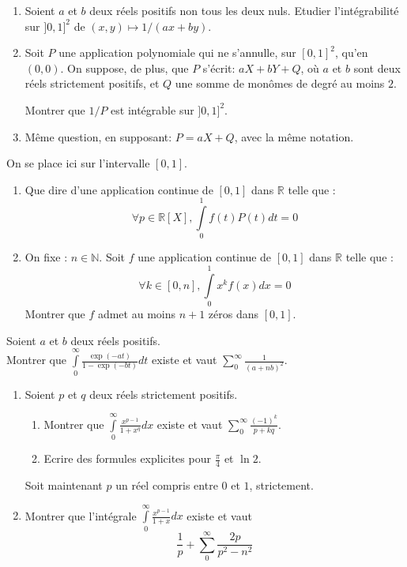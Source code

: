 
\begin{exer}
\begin{enumerate}
\item Soient $a$ et $b$ deux réels positifs non tous les deux nuls. %
Etudier l'intégrabilité sur $]0,1]^{2}$ de $(x,y) \mapsto 1/(ax + by)$.
\item Soit $P$ une application polynomiale qui ne s'annulle, sur $[0,1]^{2}$, qu'en $(0,0)$. %
On suppose, de plus, que $P$ s'écrit: $aX + bY + Q$, où $a$ et $b$ sont deux réels strictement positifs, %
et $Q$ une somme de monômes de degré au moins $2$.

Montrer que $1/P$ est intégrable sur $]0,1]^{2}$.
\item Même question, en supposant: $P = aX + Q$, avec la même notation.
\end{enumerate}
\end{exer}

\begin{exer}
On se place ici sur l'intervalle $[0,1]$.
\begin{enumerate}
\item Que dire d'une application continue de $[0,1]$ dans $\mathbb{R}$ telle que :
\[\forall p \in \mathbb{R}[X] , \int\limits_0^1 f(t)P(t) dt = 0\]
\item On fixe : $n \in \mathbb{N}$. %
Soit $f$ une application continue de $[0,1]$ dans $\mathbb{R}$ telle que :
\[\forall k \in [0,n] , \int\limits_0^1 x^k f(x) dx = 0\]
Montrer que $f$ admet au moins $n+1$ z\'eros dans $[0,1]$.
\end{enumerate}
\end{exer}

\begin{exer}
Soient $a$ et $b$ deux réels positifs.\\
Montrer que $\int\limits_0^{\infty} \frac{\exp(-at)}{1 - \exp(-bt)} dt$ existe %
et vaut $\sum\limits_0^{\infty} \frac{1}{(a + nb)^2}$.
\end{exer}

\begin{exer}
\begin{enumerate}
\item Soient $p$ et $q$ deux réels strictement positifs.
\begin{enumerate}
\item Montrer que $\int\limits_0^{\infty} \frac{x^{p-1}}{1+x^q} dx$ existe et vaut $\sum\limits_0^{\infty} \frac{(-1)^k}{p+kq}$.
\item Ecrire des formules explicites pour $\frac{\pi}{4}$ et $\ln 2$.
\end{enumerate}

Soit maintenant $p$ un réel compris entre $0$ et $1$, strictement.
\item Montrer que l'intégrale $\int\limits_0^{\infty} \frac{x^{p-1}}{1+x} dx$ existe et vaut
\[\frac{1}{p} + \sum\limits_0^{\infty} \frac{2p}{p^2 - n^2}\]
\end{enumerate}
\end{exer}

